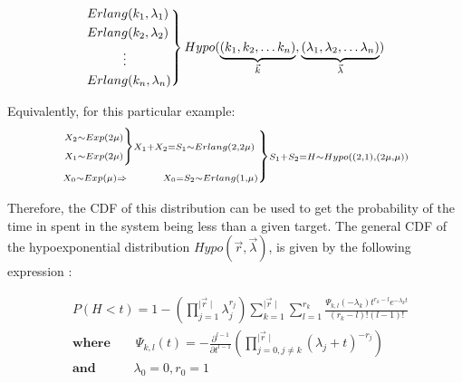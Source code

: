\begin{equation}\label{eq:connection_between_Hypoexponential_Erlang}
    \begin{rcases}
        Erlang(k_1, \lambda_1) \\
        Erlang(k_2, \lambda_2) \\
        \hspace{1cm} \vdots \\
        Erlang(k_n, \lambda_n)
    \end{rcases}
    Hypo(
        \underbrace{(k_1, k_2, \dots k_n)}_{\vec{k}}, 
        \underbrace{(\lambda_1, \lambda_2, \dots \lambda_n)}_{\vec{\lambda}}
    )
\end{equation}

Equivalently, for this particular example:
\begin{align} \label{eq:multiple_servers_distribution_example}
    \begin{rcases}
        \begin{rcases}
            \scriptstyle{X_2 \sim Exp(2\mu)} \\
            \scriptstyle{X_1 \sim Exp(2\mu)}
        \end{rcases}
        \scriptstyle{X_1 + X_2 = S_1 \sim Erlang(2, 2\mu)} \\
        \scriptstyle{X_0 \sim Exp(\mu) \Rightarrow 
        \hspace{1cm} X_0 = S_2 \sim Erlang(1, \mu)}
    \end{rcases}
    \scriptstyle{S_1 + S_2 = H \sim Hypo((2,1), (2\mu, \mu))}
\end{align}

Therefore, the CDF of this distribution can be used to get the probability of 
the time in spent in the system being less than a given target.
The general CDF of the hypoexponential distribution \(Hypo(\vec{r}, 
\vec{\lambda})\), is given by the following expression \cite{Favaro2010}:

\begin{align} \label{eq:general_cdf_hypoexponential}
    & P(H < t) = 1 - \left( \prod_{j=1}^{\mid \vec{r} \mid} \lambda_j^{r_j} \right) 
    \sum_{k=1}^{\mid \vec{r} \mid} \sum_{l=1}^{r_k} \frac{\Psi_{k,l}(-\lambda_k)t^{r_k - l} 
    e^{-\lambda_k t}}
    {(r_k - l)! (l - 1)!} \nonumber \\ 
    & \textbf{where} \qquad \Psi_{k,l}(t) = - \frac{\partial^{l - 1}}
    {\partial t ^{l - 1}} \left( \prod_{j = 0, j \neq k}^{\mid \vec{r} \mid} 
    (\lambda_j + t)^{-r_j} \right) \nonumber \\
    & \textbf{and} \quad \qquad \lambda_0 = 0, r_0 = 1
\end{align}


